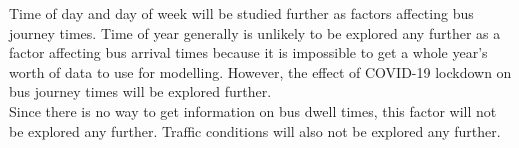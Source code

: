 Time of day and day of week will be studied further as factors affecting bus journey times. Time of year generally is unlikely to be explored any further as a factor affecting bus arrival times because it is impossible to get a whole year's worth of data to use for modelling. However, the effect of COVID-19 lockdown on bus journey times will be explored further. \\

Since there is no way to get information on bus dwell times, this factor will not be explored any further. Traffic conditions will also not be explored any further. \\

\clearpage